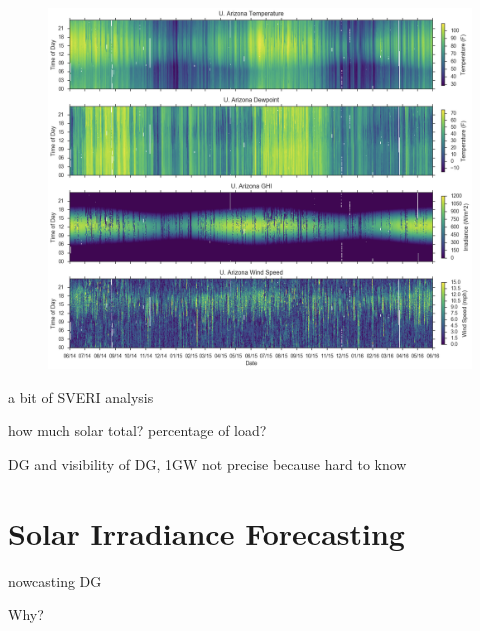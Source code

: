 \begin{figure}[h]
\centering
\includegraphics[width=\textwidth]{figs/ua_heat.png}
\end{figure}

a bit of SVERI analysis

how much solar total?
percentage of load?

DG and visibility of DG, 1GW not precise because hard to know


\section{Solar Irradiance Forecasting}
nowcasting DG

Why?

